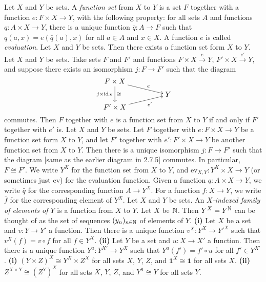  Let $X$ and $Y$ be sets. A \textit{function set} from $X$ to $Y$ is a set $F$ together with a function $e \colon F \times X \to Y$, with the following property: for all sets $A$ and functions $q \colon A \times X \to Y$, there is a unique function $\bar{q} \colon A \to F$ such that $q(a, x) = e(\bar{q}(a), x)$ for all $a \in A$ and $x \in X$. A function $e$ is called \textit{evaluation}.
 Let $X$ and $Y$ be sets. Then there exists a function set form $X$ to $Y$.
 Let $X$ and $Y$ be sets. Take sets $F$ and $F'$ and functions $F \times X \xrightarrow{e} Y$, $F' \times X \xrightarrow{e'} Y$, and suppose there exists an isomorphism $j \colon F \to F'$ such that the diagram
\[\begin{tikzcd}[cramped,row sep=tiny]
	{F \times X} \\
	&& Y \\
	{F' \times X}
	\arrow["e", from=1-1, to=2-3]
	\arrow["{j \times \text{id}_X}"', "\cong", from=1-1, to=3-1]
	\arrow["{e'}"', from=3-1, to=2-3]
\end{tikzcd}\]
commutes. Then $F$ together with $e$ is a function set from $X$ to $Y$ if and only if $F'$ together with $e'$ is.
 Let $X$ and $Y$ be sets. Let $F$ together with $e \colon F \times X \to Y$ be a function set form $X$ to $Y$, and let $F'$ together with $e' \colon F' \times X \to Y$ be another function set from $X$ to $Y$. Then there is a unique isomorphism $j \colon F \to F'$ such that the diagram [same as the earlier diagram in 2.7.5] commutes. In particular, $F \cong F'$.
 We write $Y^X$ for the function set from $X$ to $Y$, and $\text{ev}_{X, Y} \colon Y^X \times X \to Y$ (or sometimes just $\text{ev}$) for the evaluation function. Given a function $q \colon A \times X \to Y$, we write $\bar{q}$ for the corresponding function $A \to Y^X$. For a function $f \colon X \to Y$, we write $\bar{f}$ for the corresponding element of $Y^X$.
 Let $X$ and $Y$ be sets. An \textit{$X$-indexed family of elements of $Y$} is a function from $X$ to $Y$.
 Let $X$ be $\operatorname{\mathbb{N}}$. Then $Y^X = Y^{\operatorname{\mathbb{N}}}$ can be thought of as the set of sequences $(y_n)_{n \in \operatorname{\mathbb{N}}}$ of elements of $Y$.
 \textbf{(i)} Let $X$ be a set and $v \colon Y \to Y'$ a function. Then there is a unique function $v^X \colon Y^X \to Y'^X$ such that $v^X(f) = v \circ f$ for all $f \in Y^X$. \textbf{(ii)} Let $Y$ be a set and $u \colon X \to X'$ a function. Then there is a unique function $Y^u \colon Y^{X'} \to Y^X$ such that $Y^u(f') = f' \circ u$ for all $f' \in Y^{X'}$.
 \textbf{(i)} $(Y \times Z)^X \cong Y^X \times Z^X$ for all sets $X$, $Y$, $Z$, and $\mathbf{1}^X \cong \mathbf{1}$ for all sets $X$. \textbf{(ii)} $Z^{X \times Y} \cong (Z^Y)^X$ for all sets $X$, $Y$, $Z$, and $Y^{\mathbf{1}} \cong Y$ for all sets $Y$.
